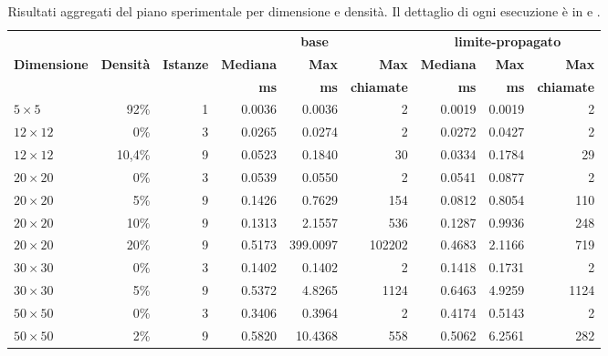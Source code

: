 \begin{table}[H]
\centering
\small
\setlength{\tabcolsep}{4.2pt}
\begin{tabular}{@{}l r r r r r r r r@{}}
\toprule
& & & \multicolumn{3}{c}{\textbf{base}} & \multicolumn{3}{c}{\textbf{limite-propagato}} \\
\cmidrule(lr){4-6}\cmidrule(l){7-9}
\textbf{Dimensione} & \textbf{Densità} & \textbf{Istanze} &
\textbf{Mediana} & \textbf{Max} & \textbf{Max} &
\textbf{Mediana} & \textbf{Max} & \textbf{Max} \\
& & & \textbf{ms} & \textbf{ms} & \textbf{chiamate} & \textbf{ms} & \textbf{ms} & \textbf{chiamate} \\
\midrule
$5\times5$   & 92\%   & 1 & \num{0.0036} & \num{0.0036}   & 2            & \num{0.0019} & \num{0.0019} & 2 \\
$12\times12$ & 0\%    & 3 & \num{0.0265} & \num{0.0274}   & 2            & \num{0.0272} & \num{0.0427} & 2 \\
$12\times12$ & 10,4\% & 9 & \num{0.0523} & \num{0.1840}   & 30           & \num{0.0334} & \num{0.1784} & 29 \\
$20\times20$ & 0\%    & 3 & \num{0.0539} & \num{0.0550}   & 2            & \num{0.0541} & \num{0.0877} & 2 \\
$20\times20$ & 5\%    & 9 & \num{0.1426} & \num{0.7629}   & 154          & \num{0.0812} & \num{0.8054} & 110 \\
$20\times20$ & 10\%   & 9 & \num{0.1313} & \num{2.1557}   & 536          & \num{0.1287} & \num{0.9936} & 248 \\
$20\times20$ & 20\%   & 9 & \num{0.5173} & \num{399.0097} & \num{102202} & \num{0.4683} & \num{2.1166} & 719 \\
$30\times30$ & 0\%    & 3 & \num{0.1402} & \num{0.1402}   & 2            & \num{0.1418} & \num{0.1731} & 2 \\
$30\times30$ & 5\%    & 9 & \num{0.5372} & \num{4.8265}   & \num{1124}   & \num{0.6463} & \num{4.9259} & \num{1124} \\
$50\times50$ & 0\%    & 3 & \num{0.3406} & \num{0.3964}   & 2            & \num{0.4174} & \num{0.5143} & 2 \\
$50\times50$ & 2\%    & 9 & \num{0.5820} & \num{10.4368}  & 558          & \num{0.5062} & \num{6.2561} & 282 \\
\bottomrule
\end{tabular}
\caption{Risultati aggregati del piano sperimentale per dimensione e
densità. Il dettaglio di ogni esecuzione è in 
e .}
\label{tab:risultati}
\end{table}

